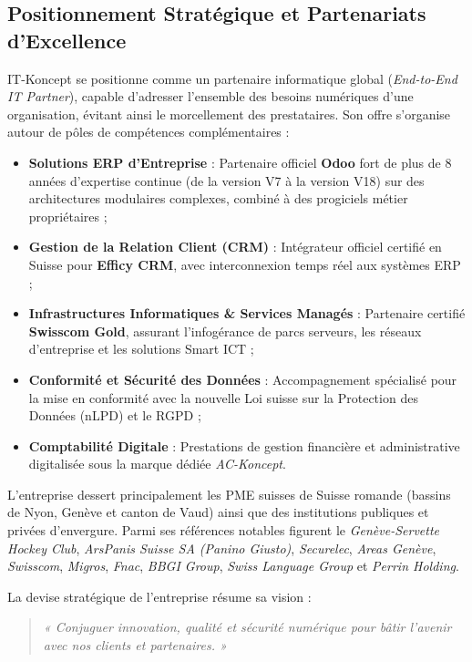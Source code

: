 \subsection{Positionnement Stratégique et Partenariats d'Excellence}
IT-Koncept se positionne comme un partenaire informatique global (\textit{End-to-End IT Partner}), capable d'adresser l'ensemble des besoins numériques d'une organisation, évitant ainsi le morcellement des prestataires. Son offre s'organise autour de pôles de compétences complémentaires :
\begin{itemize}[leftmargin=1.5cm, label=\textcolor{odooPurple}{\small\textbullet}]
    \item \textbf{Solutions ERP d'Entreprise} : Partenaire officiel \textbf{Odoo} fort de plus de 8 années d'expertise continue (de la version V7 à la version V18) sur des architectures modulaires complexes, combiné à des progiciels métier propriétaires ;
    \item \textbf{Gestion de la Relation Client (CRM)} : Intégrateur officiel certifié en Suisse pour \textbf{Efficy CRM}, avec interconnexion temps réel aux systèmes ERP ;
    \item \textbf{Infrastructures Informatiques \& Services Managés} : Partenaire certifié \textbf{Swisscom Gold}, assurant l'infogérance de parcs serveurs, les réseaux d'entreprise et les solutions Smart ICT ;
    \item \textbf{Conformité et Sécurité des Données} : Accompagnement spécialisé pour la mise en conformité avec la nouvelle Loi suisse sur la Protection des Données (nLPD) et le RGPD ;
    \item \textbf{Comptabilité Digitale} : Prestations de gestion financière et administrative digitalisée sous la marque dédiée \textit{AC-Koncept}.
\end{itemize}

L'entreprise dessert principalement les PME suisses de Suisse romande (bassins de Nyon, Genève et canton de Vaud) ainsi que des institutions publiques et privées d'envergure. Parmi ses références notables figurent le \textit{Genève-Servette Hockey Club}, \textit{ArsPanis Suisse SA (Panino Giusto)}, \textit{Securelec}, \textit{Areas Genève}, \textit{Swisscom}, \textit{Migros}, \textit{Fnac}, \textit{BBGI Group}, \textit{Swiss Language Group} et \textit{Perrin Holding}.

La devise stratégique de l'entreprise résume sa vision :
\begin{quote}
\itshape
« Conjuguer innovation, qualité et sécurité numérique pour bâtir l'avenir avec nos clients et partenaires. »
\end{quote}

